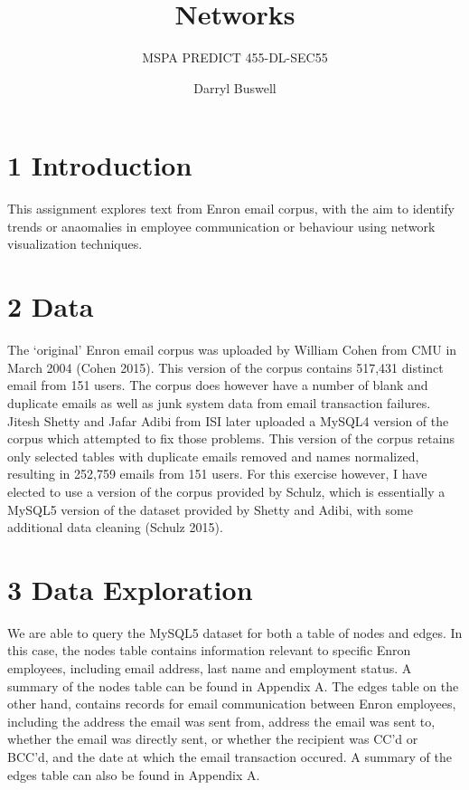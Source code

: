 \documentclass[]{article}
\title{Networks}
\subtitle{MSPA PREDICT 455-DL-SEC55}
\author{Darryl Buswell}
\date{}
\begin{document}
\maketitle

\newpage

\section{1 Introduction}\label{introduction}

This assignment explores text from Enron email corpus, with the aim to
identify trends or anaomalies in employee communication or behaviour
using network visualization techniques.

\section{2 Data}\label{data}

The `original' Enron email corpus was uploaded by William Cohen from CMU
in March 2004 (Cohen 2015). This version of the corpus contains 517,431
distinct email from 151 users. The corpus does however have a number of
blank and duplicate emails as well as junk system data from email
transaction failures. Jitesh Shetty and Jafar Adibi from ISI later
uploaded a MySQL4 version of the corpus which attempted to fix those
problems. This version of the corpus retains only selected tables with
duplicate emails removed and names normalized, resulting in 252,759
emails from 151 users. For this exercise however, I have elected to use
a version of the corpus provided by Schulz, which is essentially a
MySQL5 version of the dataset provided by Shetty and Adibi, with some
additional data cleaning (Schulz 2015).

\section{3 Data Exploration}\label{data-exploration}

We are able to query the MySQL5 dataset for both a table of nodes and
edges. In this case, the nodes table contains information relevant to
specific Enron employees, including email address, last name and
employment status. A summary of the nodes table can be found in Appendix
A. The edges table on the other hand, contains records for email
communication between Enron employees, including the address the email
was sent from, address the email was sent to, whether the email was
directly sent, or whether the recipient was CC'd or BCC'd, and the date
at which the email transaction occured. A summary of the edges table can
also be found in Appendix A.
\end{document}
